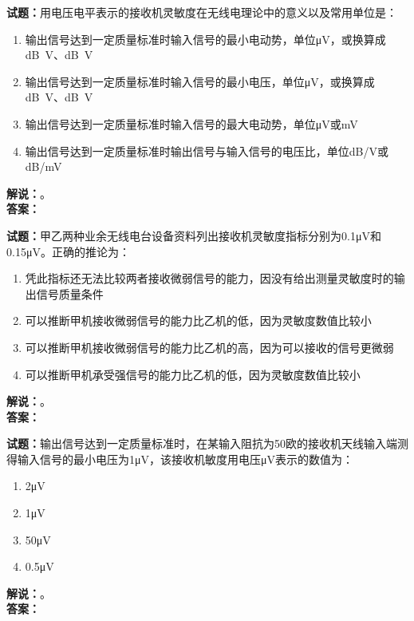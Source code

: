 \documentclass{ctexbook}
\begin{document}
\bigskip




\noindent\textbf{试题：}用电压电平表示的接收机灵敏度在无线电理论中的意义以及常用单位是：
\begin{enumerate}[leftmargin=3em]
\item 输出信号达到一定质量标准时输入信号的最小电动势，单位μV，或换算成\unit[qualifier-mode=combine]{\deci\bel{}}V、\unit[qualifier-mode=combine]{\deci\bel{}}V
\item 输出信号达到一定质量标准时输入信号的最小电压，单位μV，或换算成\unit[qualifier-mode=combine]{\deci\bel{}}V、\unit[qualifier-mode=combine]{\deci\bel{}}V
\item 输出信号达到一定质量标准时输入信号的最大电动势，单位μV或mV
\item 输出信号达到一定质量标准时输出信号与输入信号的电压比，单位dB/V或dB/mV
\end{enumerate}
\noindent\textbf{解说：}\textbf{}。\\\noindent\textbf{答案：}

\bigskip




\noindent\textbf{试题：}甲乙两种业余无线电台设备资料列出接收机灵敏度指标分别为0.1μV和0.15μV。正确的推论为：
\begin{enumerate}[leftmargin=3em]
\item 凭此指标还无法比较两者接收微弱信号的能力，因没有给出测量灵敏度时的输出信号质量条件
\item 可以推断甲机接收微弱信号的能力比乙机的低，因为灵敏度数值比较小
\item 可以推断甲机接收微弱信号的能力比乙机的高，因为可以接收的信号更微弱
\item 可以推断甲机承受强信号的能力比乙机的低，因为灵敏度数值比较小
\end{enumerate}
\noindent\textbf{解说：}\textbf{}。\\\noindent\textbf{答案：}

\bigskip




\noindent\textbf{试题：}输出信号达到一定质量标准时，在某输入阻抗为50欧的接收机天线输入端测得输入信号的最小电压为1μV，该接收机敏度用电压μV表示的数值为：
\begin{enumerate}[leftmargin=3em]
\item 2μV
\item 1μV
\item 50μV
\item 0.5μV
\end{enumerate}
\noindent\textbf{解说：}\textbf{}。\\\noindent\textbf{答案：}
\end{document}
